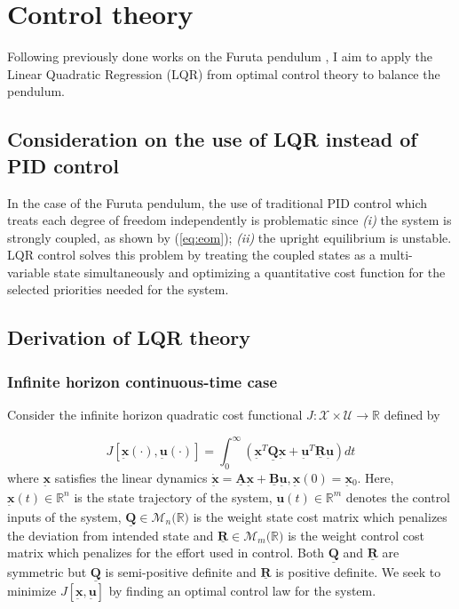 \documentclass[12pt]{article}
\newcommand{\vb}[1]{{\underset{\tilde{}}{\mathbf{#1}}}}
\newcommand{\mb}[1]{\underline{\mathbf{#1}}}
\begin{document}
\newpage

\section{Control theory}
\label{sec:control}

Following previously done works on the Furuta pendulum \cite{Furuta1992PseudoState,FantoniLozano2002}, I aim to apply the Linear Quadratic Regression (LQR) from optimal control theory \cite{Kalman1960Contributions,AndersonMoore1990} to balance the pendulum.

\subsection{Consideration on the use of LQR instead of PID control}
\label{sec:lqr-vs-pid}

In the case of the Furuta pendulum, the use of traditional PID control which treats each degree of freedom independently is problematic since \textit{(i)} the system is strongly coupled, as shown by (\ref{eq:eom}); \textit{(ii)} the upright equilibrium is unstable. LQR control solves this problem by treating the coupled states as a multi-variable state simultaneously and optimizing a quantitative cost function for the selected priorities needed for the system.

\subsection{Derivation of LQR theory}
\label{sec:lqr-derivation}
\subsubsection{Infinite horizon continuous-time case}
\label{sec:lqr-continuous}

Consider the infinite horizon quadratic cost functional \(J: \mathcal{X} \times \mathcal{U} \to \mathbb{R}\) defined by

\[
J [\vb{x}(\cdot), \vb{u}(\cdot)] =\int ^\infty _0 \left( \vb{x}{}^T \mb{Q}\vb{x} + \vb{u}{}^T \mb{R} \vb{u}{}\right) dt
\]
where $\vb{x}{}$ satisfies the linear dynamics \(\dot{\vb{x}} = \mb{A}\vb{x} +\mb{B}\vb{u}, \vb{x}(0) = \vb{x}{}_0\). Here, $\vb{x}(t) \in \mathbb{R}^n$ is the state trajectory of the system, $\vb{u}(t) \in \mathbb{R}^m$ denotes the control inputs of the system, $\mb{Q}\in \mathcal{M}_n (\mathbb{R)}$ is the weight state cost matrix which penalizes the deviation from intended state and $\mb{R} \in \mathcal{M}_m (\mathbb{R)}$ is the weight control cost matrix which penalizes for the effort used in control. Both $\mb{Q}$ and $\mb{R}$ are symmetric but $\mb{Q}$ is semi-positive definite and $\mb{R}$ is positive definite. We seek to minimize $J[\vb{x}, \vb{u}]$ by finding an optimal control law for the system.
\end{document}
